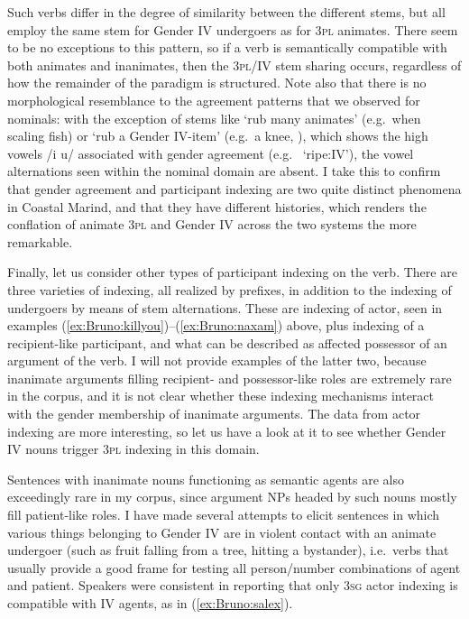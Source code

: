 \documentclass[output=collectionpaper]{langsci/langscibook}
\begin{document}
Such verbs differ in the degree of similarity between the different stems, but all employ the same stem for Gender IV undergoers as for 3\textsc{pl} animates. There seem to be no exceptions to this pattern, so if a verb is semantically compatible with both animates and inanimates, then the 3\textsc{pl}/IV stem sharing occurs, regardless of how the remainder of the paradigm is structured. Note also that there is no morphological resemblance to the agreement patterns that we observed for nominals: with the exception of stems like  `rub many animates' (e.g.\ when scaling fish) or `rub a Gender IV-item' (e.g.\ a knee, ), which shows the high vowels /i u/ associated with gender agreement (e.g.\  `ripe:IV'), the vowel alternations seen within the nominal domain are absent. I take this to confirm that gender agreement and participant indexing are two quite distinct phenomena in Coastal Marind, and that they have different histories, which renders the conflation of animate 3\textsc{pl} and Gender IV across the two systems the more remarkable.

Finally, let us consider other types of participant indexing on the verb. There are three varieties of indexing, all realized by prefixes, in addition to the indexing of undergoers by means of stem alternations. These are indexing of actor, seen in examples (\ref{ex:Bruno:killyou})--(\ref{ex:Bruno:naxam}) above, plus indexing of a recipient-like participant, and what can be described as affected possessor of an argument of the verb. I will not provide examples of the latter two, because inanimate arguments filling  recipient- and possessor-like roles are extremely rare in the corpus, and it is not clear whether these indexing mechanisms interact with the gender membership of inanimate arguments. The data from actor indexing are more interesting, so let us have a look at it to see whether Gender IV nouns trigger 3\textsc{pl} indexing in this domain.

Sentences with inanimate nouns functioning as semantic agents are also exceedingly rare in my corpus, since argument NPs headed by such nouns mostly fill patient-like roles. I have made several attempts to elicit sentences in which various things belonging to Gender IV are in violent contact with an animate undergoer (such as fruit falling from a tree, hitting a bystander), i.e.\ verbs that usually provide a good frame for testing all person/number combinations of agent and patient. Speakers were consistent in reporting that only 3\textsc{sg} actor indexing is compatible with IV agents, as in (\ref{ex:Bruno:salex}).
\end{document}

